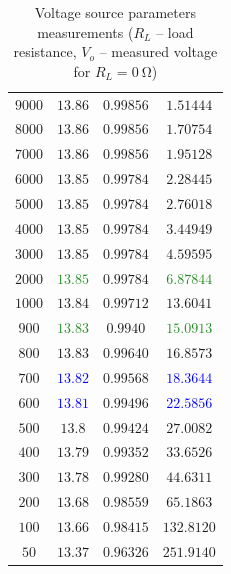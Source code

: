 \begin{table}[H]
\begin{subtable}[c]{0.5\textwidth}
\begin{tabular}{ c | c | c | c}
			$9000$ & $13.86$ & $0.99856$ & $1.51444$ \\
			$8000$ & $13.86$ & $0.99856$ & $1.70754$ \\
			$7000$ & $13.86$ & $0.99856$ & $1.95128$ \\
			$6000$ & $13.85$ & $0.99784$ & $2.28445$ \\
			$5000$ & $13.85$ & $0.99784$ & $2.76018$ \\
			$4000$ & 	\textcolor{BrickRed}{$13.85$} & $0.99784$ & 	\textcolor{BrickRed}{$3.44949$} \\
			$3000$ & $13.85$ & $0.99784$ & $4.59595$ \\
			$2000$ & 	\textcolor{ForestGreen}{$13.85$} & $0.99784$ & 	\textcolor{ForestGreen}{$6.87844$}\\
			$1000$ & 	\textcolor{BrickRed}{$13.84$} & $0.99712$ &	\textcolor{BrickRed}{$13.6041$} \\
			$900$ & 	\textcolor{ForestGreen}{$13.83$} & $0.9940$ & 	\textcolor{ForestGreen}{$15.0913$} \\
			$800$ & $13.83$ & $0.99640$ & $16.8573$ \\
			$700$ &	\textcolor{blue}{ $13.82$} & $0.99568$ & \textcolor{blue}{ $18.3644$ }\\
			$600$ & \textcolor{blue}{ $13.81$} & $0.99496$ & \textcolor{blue}{ $22.5856$} \\
			$500$ & $13.8$ & $0.99424$ & $27.0082$ \\
			$400$ & $13.79$ & $0.99352$ & $33.6526$ \\
			$300$ & $13.78$ & $0.99280$ & $44.6311$ \\
			$200$ & $13.68$ & $0.98559$ & $65.1863$ \\
			$100$ & $13.66$ & $0.98415$ & $132.8120$ \\
			$50$ & $13.37$ & $0.96326$ & $251.9140$ \\
		\end{tabular}
	\end{subtable}
	\caption{Voltage source parameters measurements ($R_L$ -- load resistance, $V_o$ -- measured voltage for $R_L = \SI{0}{\ohm}$)}
	\label{tab:2}
\end{table}

